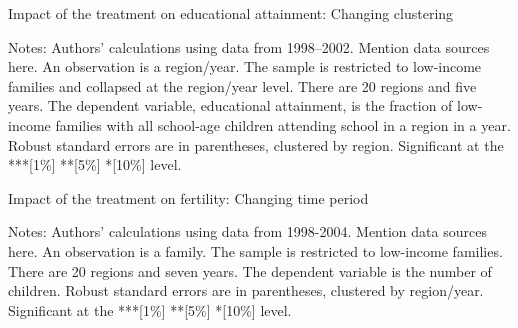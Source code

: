 \documentclass[12pt,a4paper]{article}
\begin{document}
\begin{footnotesize}
\begin{table}[H]
   \centering
   \caption{Impact of the treatment on educational attainment: Changing clustering} \label{tab:table3}
   \begin{threeparttable}
         \footnotesize 
     
        \begin{tablenotes}
        \scriptsize 
        \item{Notes: Authors’ calculations using data from 1998--2002. Mention data sources here. An observation is a region/year. The sample is restricted to low-income families and collapsed at the region/year level. There are 20 regions and five years. The dependent variable, educational attainment, is the fraction of low-income families with all school-age children attending school in a region in a year. Robust standard errors are in parentheses, clustered by region. Significant at the ***[1\%] **[5\%] *[10\%] level.
}
        \end{tablenotes}  
   \end{threeparttable}                          
\end{table}


\begin{table}[H]
   \centering
   \caption{Impact of the treatment on fertility: Changing time period} \label{tab:table4}
   \begin{threeparttable}
         \footnotesize 
     
        \begin{tablenotes}
        \scriptsize 
        \item{Notes: Authors’ calculations using data from 1998-2004. Mention data sources here. An observation is a family. The sample is restricted to low-income families. There are 20 regions and seven years. The dependent variable is the number of children. Robust standard errors are in parentheses, clustered by region/year. Significant at the ***[1\%] **[5\%] *[10\%] level.
}
        \end{tablenotes}  
   \end{threeparttable}                          
\end{table}



\end{footnotesize}
\end{document}

